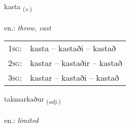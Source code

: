 \documentclass[frontgrid, backgrid]{flacards}\usepackage[]{graphicx}\usepackage[]{xcolor}
\begin{document}
\renewcommand{\flhead}{\vskip5pt \fboxsep=0pt {\small\bfseries\footnotesize Sagnorð | Verb}}
\renewcommand{\fcfoot}{\vskip5pt \fboxsep=0pt \hspace{2pt}{\small\bfseries\footnotesize 2K}}

\renewcommand{\blhead}{\vskip5pt {\small\bfseries\footnotesize Sagnorð | Verb }}
\renewcommand{\bcfoot}{\vskip5pt \hspace{2pt}{\small\bfseries\footnotesize 2K}}


{kasta \small{\textsubscript{(\textit{v.})}} \\[1ex] %
\textphonetic{[kʰasta]} \\
en.: \emph{throw, cast} \\  [2ex]
\renewcommand*{\arraystretch}{0.8}
\begin{tabular}{p{1cm}l}
\textsc{1sg}: & kasta -- kastaði -- kastað \\ 
\textsc{2sg}: & kastar -- kastaðir -- kastað \\ 
\textsc{3sg}: & kastar -- kastaði -- kastað \\ 
\end{tabular}
}

\renewcommand{\flhead}{\vskip5pt \fboxsep=0pt {\small\bfseries\footnotesize Lýsingarorð | Adjective}}
\renewcommand{\fcfoot}{\vskip5pt \fboxsep=0pt \hspace{2pt}{\small\bfseries\footnotesize 2K}}

\renewcommand{\blhead}{\vskip5pt {\small\bfseries\footnotesize Lýsingarorð | Adjective }}
\renewcommand{\bcfoot}{\vskip5pt \hspace{2pt}{\small\bfseries\footnotesize 2K}}


{takmarkaður \small{\textsubscript{(\textit{adj.})}} \\[1ex] %
 \\
en.: \emph{limited} \\  [2ex]
\renewcommand*{\arraystretch}{0.8}
}
\end{document}

